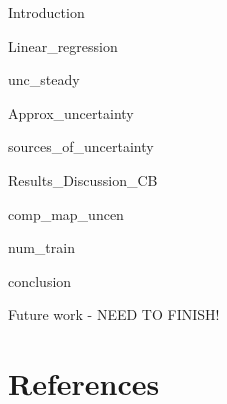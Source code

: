 \documentclass[a4paper]{jpconf}
\newcommand{\blCom}[1]{\begingroup\sffamily\color{blue} #1 \endgroup}  %
\begin{document}
\blCom{Introduction} %


\blCom{Linear\_regression}


\blCom{unc\_steady}


\blCom{Approx\_uncertainty}


\blCom{sources\_of\_uncertainty}


\blCom{Results\_Discussion\_CB}



\blCom{comp\_map\_uncen}


\blCom{num\_train}



\blCom{conclusion}


\blCom{Future work - NEED TO FINISH!}


\section*{References}


%
\end{document}
